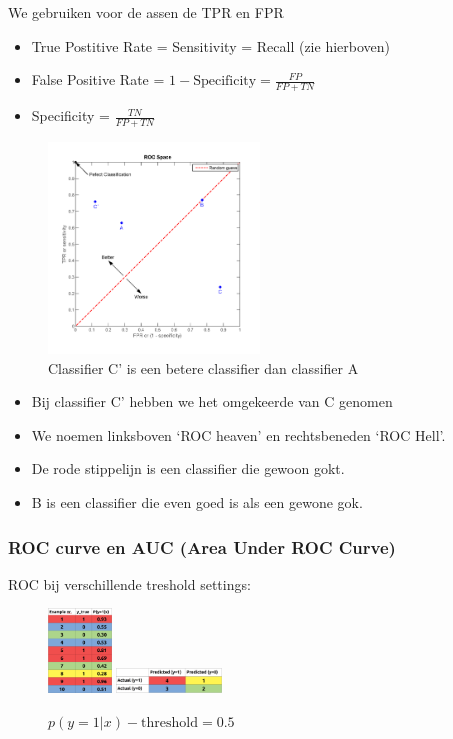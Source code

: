 \documentclass{article}
\begin{document}
We gebruiken voor de assen de TPR en FPR

\begin{itemize}
    \item True Postitive Rate = Sensitivity = Recall (zie hierboven)
    \item False Positive Rate = $1 - \text{Specificity} = \frac{FP}{FP + TN}$
    \item Specificity = $\frac{TN}{FP + TN}$
\end{itemize}

\begin{figure}[H]
    \centering
    \includegraphics[width=0.5\textwidth]{roc3.png}
    \caption{Classifier C' is een betere classifier dan classifier A}
\end{figure}

\begin{itemize}
    \item Bij classifier C' hebben we het omgekeerde van C genomen
    \item We noemen linksboven `ROC heaven' en rechtsbeneden `ROC Hell'.
    \item De rode stippelijn is een classifier die gewoon gokt.
    \item B is een classifier die even goed is als een gewone gok.
\end{itemize}


\subsubsection{ROC curve en AUC (Area Under ROC Curve)}

ROC bij verschillende treshold settings: 

\begin{figure}[H]
    \centering
    \includegraphics[width=0.15\textwidth]{roc-treshold.png}
    \includegraphics[width=0.25\textwidth]{roc-treshold2.png}
    \caption{$p(y=1 | x) - \text{threshold} = 0.5$ }
\end{figure}
\end{document}
